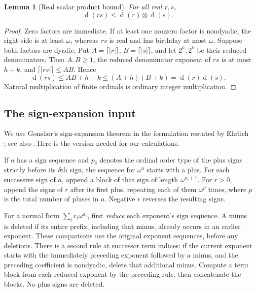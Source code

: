 \documentclass[11pt,letterpaper]{article}
\numberwithin{equation}{section}
\newtheorem{lemma}[theorem]{Lemma}
\theoremstyle{definition}
\theoremstyle{remark}
\newcommand{\rd}{\operatorname{d}}
\newcommand{\np}{\mathbin{\otimes}}
\begin{document}
\begin{lemma}[Real scalar product bound]\label{lem:realproduct}
For all real $r,s$,
\[
 \rd(rs)\leq\rd(r)\np\rd(s).
\]
\end{lemma}
\begin{proof}
Zero factors are immediate. If at least one nonzero factor is nondyadic, the
right side is at least $\omega$, whereas $rs$ is real and has birthday at most
$\omega$. Suppose both factors are dyadic. Put
$A=\lceil|r|\rceil$, $B=\lceil|s|\rceil$, and let $2^h,2^k$ be their reduced
denominators. Then $A,B\geq1$, the reduced denominator exponent of $rs$ is at
most $h+k$, and $\lceil|rs|\rceil\leq AB$. Hence
\[
 \rd(rs)\leq AB+h+k
 \leq(A+h)(B+k)=\rd(r)\rd(s).
\]
Natural multiplication of finite ordinals is ordinary integer multiplication.
\end{proof}

\subsection{The sign-expansion input}
We use Gonshor's sign-expansion theorem in the formulation restated by Ehrlich
\cite[Propositions~3.7--3.8]{Ehrlich2011}; see also
\cite[Definition~2.20 and Theorem~2.21, p.~13]{BG2022}. Here is the version needed for our
calculations.

If $a$ has a sign sequence and $p_\delta$ denotes the ordinal order type of the plus signs
strictly before its $\delta$th sign, the sequence for $\omega^a$ starts with a
plus. For each successive sign of $a$, append a block of that sign of length
$\omega^{p_\delta+1}$. For $r>0$, append the signs of $r$ after its first plus,
repeating each of them $\omega^p$ times, where $p$ is the total number of pluses
in $a$. Negative $r$ reverses the resulting signs.

For a normal form $\sum_i r_i\omega^{a_i}$, first \emph{reduce} each exponent's
sign sequence. A minus is deleted if its entire prefix, including that minus,
already occurs in an earlier exponent. These comparisons use the original
exponent sequences, before any deletions. There is a second rule at successor
term indices: if the current exponent starts with the immediately preceding
exponent followed by a minus,
and the preceding coefficient is nondyadic, delete that additional minus.
Compute a term block from each reduced exponent by the preceding rule, then
concatenate the blocks. No plus signs are deleted.
\end{document}
